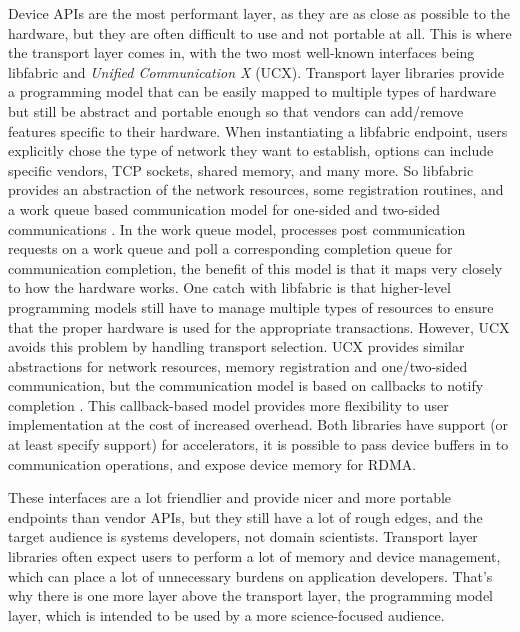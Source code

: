Device APIs are the most performant layer, as they are as close as possible to the hardware, but they are often difficult to use and not portable at all.
This is where the transport layer comes in, with the two most well-known interfaces being libfabric and \textit{Unified Communication X} (UCX).
Transport layer libraries provide a programming model that can be easily mapped to multiple types of hardware but still be abstract and portable enough so that vendors can add/remove features specific to their hardware.
When instantiating a libfabric endpoint, users explicitly chose the type of network they want to establish, options can include specific vendors, TCP sockets, shared memory, and many more.
So libfabric provides an abstraction of the network resources, some registration routines, and a work queue based communication model for one-sided and two-sided communications \cite{libfabric}.
In the work queue model, processes post communication requests on a work queue and poll a corresponding completion queue for communication completion, the benefit of this model is that it maps very closely to how the hardware works.
One catch with libfabric is that higher-level programming models still have to manage multiple types of resources to ensure that the proper hardware is used for the appropriate transactions. 
However, UCX avoids this problem by handling transport selection.
UCX provides similar abstractions for network resources, memory registration and one/two-sided communication, but the communication model is based on callbacks to notify completion \cite{shamis2015ucx}.
This callback-based model provides more flexibility to user implementation at the cost of increased overhead.
Both libraries have support (or at least specify support) for accelerators, it is possible to pass device buffers in to communication operations, and expose device memory for RDMA.

These interfaces are a lot friendlier and provide nicer and more portable endpoints than vendor APIs, but they still have a lot of rough edges, and the target audience is systems developers, not domain scientists.
Transport layer libraries often expect users to perform a lot of memory and device management, which can place a lot of unnecessary burdens on application developers.
That's why there is one more layer above the transport layer, the programming model layer, which is intended to be used by a more science-focused audience.

